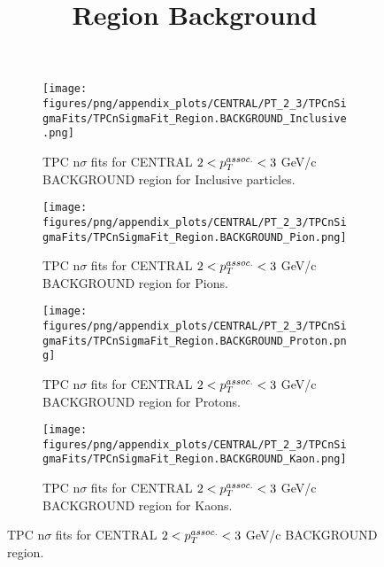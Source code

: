             \begin{figure}[H]
                \title{Region Background}
                \begin{subfigure}[b]{0.5\textwidth}
                    \centering
                    \texttt{[image: figures/png/appendix\_plots/CENTRAL/PT\_2\_3/TPCnSigmaFits/TPCnSigmaFit\_Region.BACKGROUND\_Inclusive.png]}
                    \caption{TPC n$\sigma$ fits for CENTRAL $2 < \pTassoc < 3$ GeV/c BACKGROUND region for Inclusive particles.}
                    \label{fig:appendix_CENTRAL_$2 < \pTassoc < 3$ GeV/c_BACKGROUND_Inclusive}
                \end{subfigure}
                \begin{subfigure}[b]{0.5\textwidth}
                    \centering
                    \texttt{[image: figures/png/appendix\_plots/CENTRAL/PT\_2\_3/TPCnSigmaFits/TPCnSigmaFit\_Region.BACKGROUND\_Pion.png]}
                    \caption{TPC n$\sigma$ fits for CENTRAL $2 < \pTassoc < 3$ GeV/c BACKGROUND region for Pions.}
                    \label{fig:appendix_CENTRAL_$2 < \pTassoc < 3$ GeV/c_BACKGROUND_Pion}
                \end{subfigure}
                \begin{subfigure}[b]{0.5\textwidth}
                    \centering
                    \texttt{[image: figures/png/appendix\_plots/CENTRAL/PT\_2\_3/TPCnSigmaFits/TPCnSigmaFit\_Region.BACKGROUND\_Proton.png]}
                    \caption{TPC n$\sigma$ fits for CENTRAL $2 < \pTassoc < 3$ GeV/c BACKGROUND region for Protons.}
                    \label{fig:appendix_CENTRAL_$2 < \pTassoc < 3$ GeV/c_BACKGROUND_Proton}
                \end{subfigure}
                \begin{subfigure}[b]{0.5\textwidth}
                    \centering
                    \texttt{[image: figures/png/appendix\_plots/CENTRAL/PT\_2\_3/TPCnSigmaFits/TPCnSigmaFit\_Region.BACKGROUND\_Kaon.png]}
                    \caption{TPC n$\sigma$ fits for CENTRAL $2 < \pTassoc < 3$ GeV/c BACKGROUND region for Kaons.}
                    \label{fig:appendix_CENTRAL_$2 < \pTassoc < 3$ GeV/c_BACKGROUND_Kaon}
                \end{subfigure}
                \caption{TPC n$\sigma$ fits for CENTRAL $2 < \pTassoc < 3$ GeV/c BACKGROUND region.}
                \label{fig:appendix_CENTRAL_$2 < \pTassoc < 3$ GeV/c_BACKGROUND}
            \end{figure}
            \clearpage
            
